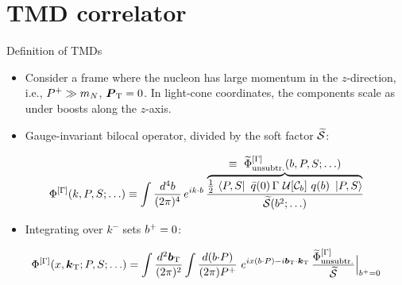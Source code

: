 \section{TMD correlator}

\begin{frame}{Definition of TMDs}
  \begin{itemize}
    \item Consider a frame where the nucleon has large momentum in the $z$-direction, i.e., $P^+ \gg m_N$, $\boldsymbol{P}_{\mathrm T} = 0$.
      In light-cone coordinates, the components scale as \textcolor{brown}{} under boosts along the $z$-axis.
    \item Gauge-invariant bilocal operator, divided by the soft factor $\widetilde{\mathcal{S}}$:
  \end{itemize}
  \[ \Phi^{[\Gamma]}(\kei,P,S;\ldots)\equiv\int \frac{d^4 \bvec}{(2\pi)^4}\, e^{i \kei\cdot \bvec}\,
     \frac{\overbrace{\tfrac{1}{2}\, \bra{P,S}\ \bar{q}(0)\, \Gamma\ \WlineC{\mathcal{C}_\bvec}\ q(\bvec)\ \ket{P,S}}^{\textstyle \equiv\ \widetilde \Phi_\unsub^{[\Gamma]}(\bvec,P,S;\ldots)}}{\widetilde{\softf}(\bvec^2;\ldots)} \]
  \begin{itemize}
    \item Integrating over $k^-$ sets $b^+=0$:
  \end{itemize}
  \[ \Phi^{[\Gamma]}(x,\boldsymbol{k}_{\mathrm T};P,S;\ldots)=\int \frac{d^2 \boldsymbol{b}_{\mathrm T}}{(2\pi)^2} \int \frac{d (b {\cdot} P)}{(2\pi) P^+}\ e^{i x (b {\cdot} P) - i\boldsymbol{b}_{\mathrm T} {\cdot} \boldsymbol{k}_{\mathrm T}}\,\frac{\widetilde \Phi_{\text{unsubtr.}}^{[\Gamma]}}{\widetilde{\mathcal{S}}}\Big|_{b^+=0} \]
\end{frame}

